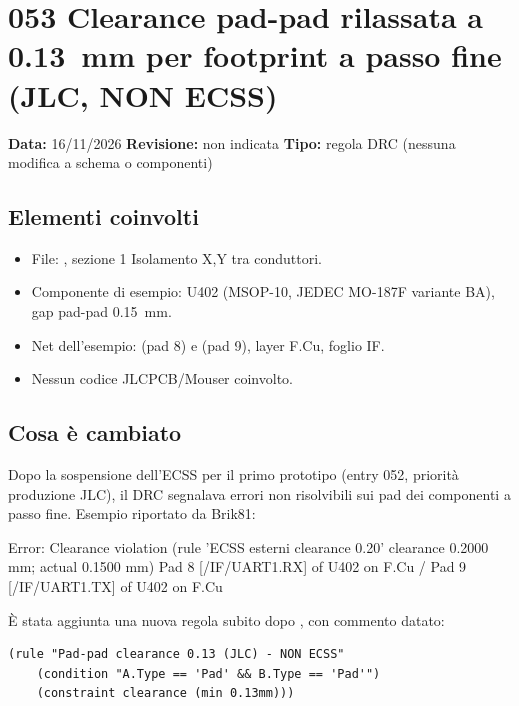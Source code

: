 \section{053 \textendash{} Clearance pad-pad rilassata a \SI{0,13}{mm} per footprint a passo fine (JLC, NON ECSS)}

\textbf{Data:} 16/11/2026 \quad \textbf{Revisione:} non indicata \quad \textbf{Tipo:} regola DRC (nessuna modifica a schema o componenti)

\subsection{Elementi coinvolti}
\begin{itemize}
\item File: , sezione 1 \guillemotleft{}Isolamento X,Y tra conduttori\guillemotright.
\item Componente di esempio: U402 (MSOP-10, JEDEC MO-187F variante BA), gap pad-pad \SI{0,15}{mm}.
\item Net dell'esempio:  (pad 8) e  (pad 9), layer F.Cu, foglio IF.
\item Nessun codice JLCPCB/Mouser coinvolto.
\end{itemize}

\subsection{Cosa è cambiato}
Dopo la sospensione dell'ECSS per il primo prototipo (entry 052, priorità produzione JLC), il DRC segnalava errori non risolvibili sui pad dei componenti a passo fine. Esempio riportato da Brik81:

\begin{notebox}
\small\ttfamily
Error: Clearance violation (rule 'ECSS esterni clearance 0.20' clearance 0.2000 mm; actual 0.1500 mm) \textemdash{} Pad 8 [/IF/UART1.RX] of U402 on F.Cu / Pad 9 [/IF/UART1.TX] of U402 on F.Cu
\end{notebox}

È stata aggiunta una nuova regola subito dopo , con commento datato:

\begin{verbatim}
(rule "Pad-pad clearance 0.13 (JLC) - NON ECSS"
    (condition "A.Type == 'Pad' && B.Type == 'Pad'")
    (constraint clearance (min 0.13mm)))
\end{verbatim}

